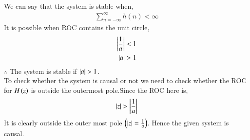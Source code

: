 \documentclass[journal,12pt,twocolumn]{IEEEtran}
\begin{document}
\begin{enumerate}
\begin{align}
       \end{align}
       We can say that the system is stable when,
        \begin{align}
	       \sum_{n=-\infty}^{\infty}h(n) < \infty
        \end{align}
	It is possible when ROC contains the unit circle, 
	 \begin{align}
		\left\vert\frac{1}{a}\right\vert < 1 \\
                 \left\vert a\right\vert > 1
         \end{align}
        $\therefore$ The system is stable if $\left\vert a\right\vert > 1$.\\
         To check whether the system is causal or not we need to check whether the ROC for $H\left(z\right)$ is outside the outermost pole.Since the ROC here is,
	  \begin{align}
		  \left\vert z\right\vert > \left\vert\frac{1}{a}\right\vert
          \end{align}
	  It is clearly outside the outer most pole $\left(\left\vert z\right\vert = \frac{1}{a}\right)$. Hence the given system is causal.
  \end{enumerate}      
 
\end{document}

